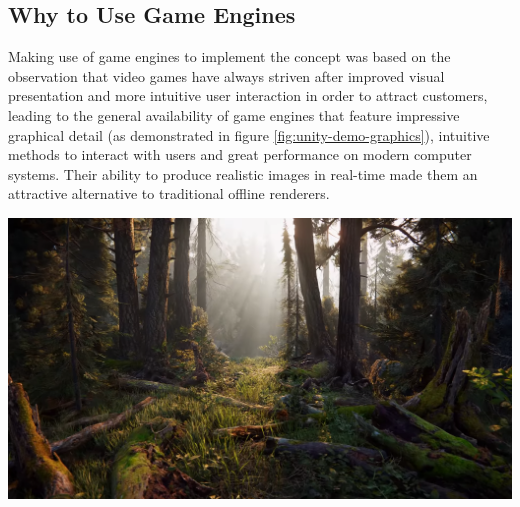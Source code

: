 \subsection{Why to Use Game Engines}
Making use of game engines to implement the concept was based on the observation that video games have always striven after improved visual presentation and more intuitive user interaction in order to attract customers, leading to the general availability of game engines that feature impressive graphical detail (as demonstrated in figure \ref{fig:unity-demo-graphics}), intuitive methods to interact with users and great performance on modern computer systems. Their ability to produce realistic images in real-time made them an attractive alternative to traditional offline renderers.
\begin{center}
\noindent\includegraphics[width=14cm]{tex/img/ch05/UnityGraphicsDemo.png}
\label{fig:unity-demo-graphics}
\end{center}

